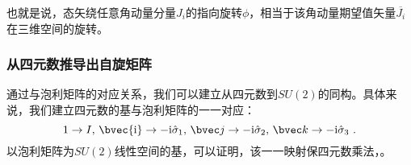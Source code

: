 也就是说，态矢绕任意角动量分量$J_i$的指向旋转$\phi$，相当于该角动量期望值矢量$\overline{J_i}$在三维空间的旋转。

\subsubsection{从四元数推导出自旋矩阵}
通过与泡利矩阵的对应关系，我们可以建立从四元数到$SU(2)$的同构。具体来说，我们建立四元数的基与泡利矩阵的一一对应：
\begin{equation}
1\rightarrow I,\,\bvec{\mathrm i}\rightarrow -\mathrm i\hat{\sigma}_1,\,\bvec j\rightarrow -\mathrm i\hat{\sigma}_2,\,\bvec k\rightarrow -\mathrm i\hat{\sigma}_3~.
\end{equation}
以泡利矩阵为$SU(2)$线性空间的基，可以证明，该一一映射保四元数乘法，。